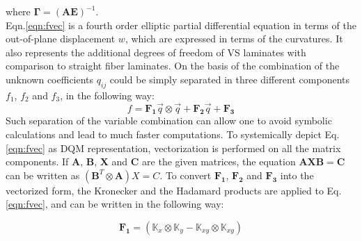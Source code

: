 \documentclass[journal]{new-aiaa}
\begin{document}
where $\bm{\Gamma}= \left(\bm{A}\bm{E}\right)^{-1}$.\\


Eqn.\ref{eqn:fvec} is a fourth order elliptic partial differential equation in terms of the out-of-plane displacement $w$, which are expressed in terms of the curvatures. It also represents the additional degrees of freedom of VS laminates with comparison to straight fiber laminates. On the basis of the combination of the unknown coefficients $q_{ij}$ could be simply separated in three different components $f_1$, $f_2$ and $f_3$, in the following way:
\begin{equation}
f=\mathbf{F_1}\vec{q} \otimes \vec{q} + \mathbf{F_2}\vec{q} + \mathbf{F_3}
\end{equation}
Such separation of the variable combination can allow one to avoid symbolic calculations and lead to much faster computations. 
To systemically depict Eq. \ref{eqn:fvec} as DQM representation, vectorization is performed on all the matrix components. If $\bm{A}$, $\bm{B}$, $\bm{X}$ and $\bm{C}$ are the given matrices, the equation $\bm{A}\bm{X}\bm{B}=\bm{C}$ can be written as $\left(\bm{B}^T\otimes\bm{A}\right)X=C$. 
To convert $\mathbf{F_1}$, $\mathbf{F_2}$ and $\mathbf{F_3}$ into the vectorized form, the Kronecker and the Hadamard products are applied to Eq. \ref{eqn:fvec}, and can be written in the following way:

\begin{equation}
\mathbf{F_1}=(\mathbb{K}_x \otimes \mathbb{K}_y -\mathbb{K}_{xy} \otimes \mathbb{K}_{xy})
\end{equation}
\end{document}
